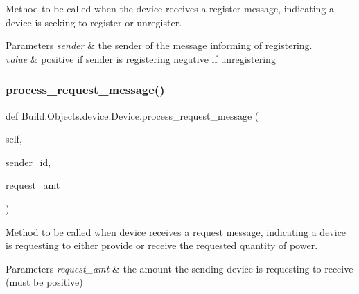 Method to be called when the device receives a register message, indicating a device is seeking to register or unregister. 


\begin{DoxyParams}{Parameters}
{\em sender} & the sender of the message informing of registering. \\
\hline
{\em value} & positive if sender is registering negative if unregistering \\
\hline
\end{DoxyParams}
\mbox{\label{class_build_1_1_objects_1_1device_1_1_device_a83c4bc3f6628bc2ba3343b96c5a441f8}} 
\subsubsection{\texorpdfstring{process\+\_\+request\+\_\+message()}{process\_request\_message()}}
{\footnotesize\ttfamily def Build.\+Objects.\+device.\+Device.\+process\+\_\+request\+\_\+message (\begin{DoxyParamCaption}\item[{}]{self,  }\item[{}]{sender\+\_\+id,  }\item[{}]{request\+\_\+amt }\end{DoxyParamCaption})}



Method to be called when device receives a request message, indicating a device is requesting to either provide or receive the requested quantity of power. 


\begin{DoxyParams}{Parameters}
{\em request\+\_\+amt} & the amount the sending device is requesting to receive (must be positive) \\
\hline
\end{DoxyParams}
\mbox{\label{class_build_1_1_objects_1_1device_1_1_device_a65e13b5bb4b33acdd37a084167829056}} 
